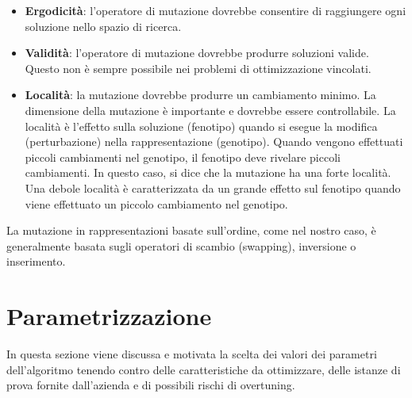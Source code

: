 \begin{itemize}
    \item \textbf{Ergodicità}: l'operatore di mutazione dovrebbe consentire di raggiungere ogni soluzione nello spazio di ricerca.
    \item \textbf{Validità}: l'operatore di mutazione dovrebbe produrre soluzioni valide. Questo non è sempre possibile nei problemi di ottimizzazione vincolati.
    \item \textbf{Località}: la mutazione dovrebbe produrre un cambiamento minimo. La dimensione della mutazione è importante e dovrebbe essere controllabile. La località è l'effetto sulla soluzione (fenotipo) quando si esegue la modifica (perturbazione) nella rappresentazione (genotipo). Quando vengono effettuati piccoli cambiamenti nel genotipo, il fenotipo deve rivelare piccoli cambiamenti. In questo caso, si dice che la mutazione ha una forte località. Una debole località è caratterizzata da un grande effetto sul fenotipo quando viene effettuato un piccolo cambiamento nel genotipo.
\end{itemize}

La mutazione in rappresentazioni basate sull'ordine, come nel nostro caso, è generalmente basata sugli operatori di scambio (swapping), inversione o inserimento. 

\section{Parametrizzazione}

In questa sezione viene discussa e motivata la scelta dei valori dei parametri dell'algoritmo tenendo contro delle caratteristiche da ottimizzare, delle istanze di prova fornite dall'azienda e di possibili rischi di overtuning.


